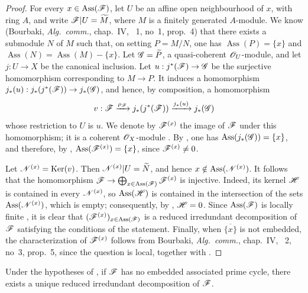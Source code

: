 \begin{proof}
For every $x\in\operatorname{Ass}(\mathscr{F})$, let $U$ be an affine open neighbourhood of $x$, with ring $A$, and write $\mathscr{F}|U=\widetilde{M}$, where $M$ is a finitely generated $A$-module.
We know (Bourbaki, \emph{Alg.\ comm.}, chap.~IV, \textsection~1, no~1, prop.~4) that there exists a submodule $N$ of $M$ such that, on setting $P=M/N$, one has $\operatorname{Ass}(P)=\{x\}$ and $\operatorname{Ass}(N)=\operatorname{Ass}(M)-\{x\}$.
Let $\mathscr{G}=\widetilde{P}$, a quasi-coherent $\mathscr{O}_U$-module, and let $j:U\to X$ be the canonical inclusion.  Let $u:j^*(\mathscr{F})\to\mathscr{G}$ be the surjective homomorphism corresponding to $M\to P$.  It induces a homomorphism $j_*(u):j_*(j^*(\mathscr{F}))\to j_*(\mathscr{G})$, and hence, by composition, a homomorphism
\[
v:\mathscr{F}\xrightarrow{\rho_{\mathscr{F}}}j_*(j^*(\mathscr{F}))\xrightarrow{j_*(u)}j_*(\mathscr{G})
\]
whose restriction to $U$ is $u$.  We denote by $\mathscr{F}^{(x)}$ the image of $\mathscr{F}$ under this homomorphism; it is a coherent $\mathscr{O}_X$-module .
By , one has $\operatorname{Ass}(j_*(\mathscr{G}))=\{x\}$, and therefore, by , $\operatorname{Ass}(\mathscr{F}^{(x)})=\{x\}$, since $\mathscr{F}^{(x)}\neq 0$.

Let $\mathscr{N}^{(x)}=\operatorname{Ker}(v)$.  Then $\mathscr{N}^{(x)}|U=\widetilde{N}$, and hence $x\notin\operatorname{Ass}(\mathscr{N}^{(x)})$.
It follows that the homomorphism $\mathscr{F}\to\bigoplus_{x\in\operatorname{Ass}(\mathscr{F})}\mathscr{F}^{(x)}$ is injective.  Indeed, its kernel $\mathscr{H}$ is contained in every $\mathscr{N}^{(x)}$, so $\operatorname{Ass}(\mathscr{H})$ is contained in the intersection of the sets $\operatorname{Ass}(\mathscr{N}^{(x)})$, which is empty; consequently, by , $\mathscr{H}=0$.
Since $\operatorname{Ass}(\mathscr{F})$ is locally finite , it is clear that $(\mathscr{F}^{(x)})_{x\in\operatorname{Ass}(\mathscr{F})}$ is a reduced irredundant decomposition of $\mathscr{F}$ satisfying the conditions of the statement.
Finally, when $\overline{\{x\}}$ is not embedded, the characterization of $\mathscr{F}^{(x)}$ follows from Bourbaki, \emph{Alg.\ comm.}, chap.~IV, \textsection~2, no~3, prop.~5, since the question is local, together with .
\end{proof}


\begin{corollary}[3.2.7]
\label{IV.3.2.7}
Under the hypotheses of , if $\mathscr{F}$ has no embedded associated prime cycle, there exists a unique reduced irredundant decomposition of $\mathscr{F}$.
\end{corollary}

